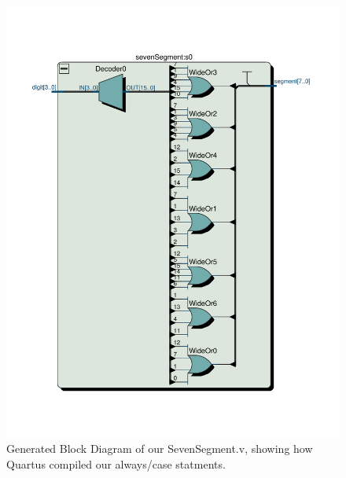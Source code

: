\documentclass[11pt]{article}
\begin{document}
\begin{figure}[H]
    \centering
        \includegraphics[clip, trim=0cm 3cm 0cm 3cm,  width=\textwidth]{SevenSegment}
        \caption{Generated Block Diagram of our SevenSegment.v, showing how Quartus compiled our always/case statments.}
\end{figure}
\end{document}
